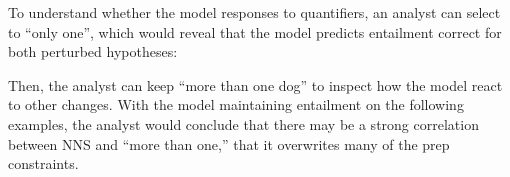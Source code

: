 
To understand whether the model responses to quantifiers, an analyst can select to \BLANK ``only one'', which would reveal that the model predicts entailment correct for both perturbed hypotheses:


Then, the analyst can keep ``more than one dog'' to inspect how the model react to other changes. 
With the model maintaining entailment on the following examples, the analyst would conclude that there may be a strong correlation between NNS and ``more than one,'' that it overwrites many of the prep constraints.


